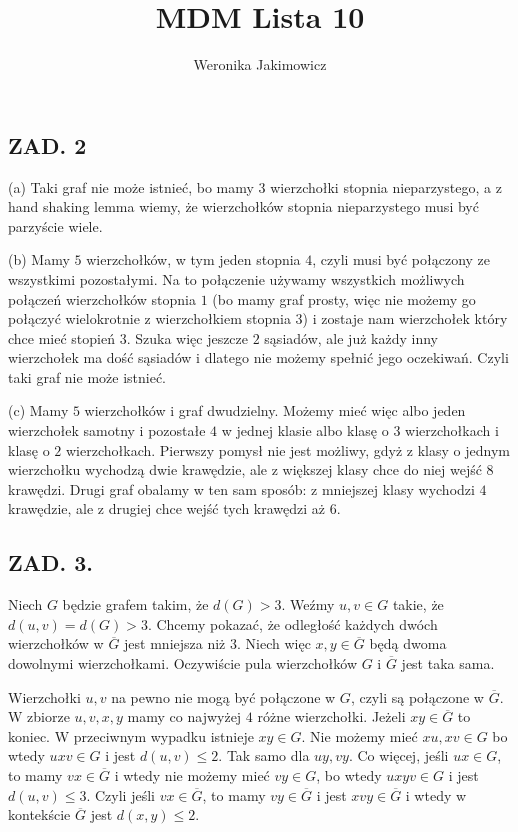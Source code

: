 \documentclass{article}
\author{Weronika Jakimowicz}
\title{MDM Lista 10}
\date{}
\begin{document}
\maketitle

\subsection*{ZAD. 2}

{\color{acc}(a)} Taki graf nie może istnieć, bo mamy 3 wierzchołki stopnia nieparzystego, a z hand shaking lemma wiemy, że wierzchołków stopnia nieparzystego musi być parzyście wiele.
\medskip

{\color{acc}(b)} Mamy $5$ wierzchołków, w tym jeden stopnia $4$, czyli musi być połączony ze wszystkimi pozostałymi. Na to połączenie używamy wszystkich możliwych połączeń wierzchołków stopnia $1$ (bo mamy graf prosty, więc nie możemy go połączyć wielokrotnie z wierzchołkiem stopnia $3$) i zostaje nam wierzchołek który chce mieć stopień $3$. Szuka więc jeszcze $2$ sąsiadów, ale już każdy inny wierzchołek ma dość sąsiadów i dlatego nie możemy spełnić jego oczekiwań. Czyli taki graf nie może istnieć.
\medskip

{\color{acc}(c)} Mamy $5$ wierzchołków i graf dwudzielny. Możemy mieć więc albo jeden wierzchołek samotny i pozostałe $4$ w jednej klasie albo klasę o $3$ wierzchołkach i klasę o $2$ wierzchołkach. Pierwszy pomysł nie jest możliwy, gdyż z klasy o jednym wierzchołku wychodzą dwie krawędzie, ale z większej klasy chce do niej wejść $8$ krawędzi. Drugi graf obalamy w ten sam sposób: z mniejszej klasy wychodzi $4$ krawędzie, ale z drugiej chce wejść tych krawędzi aż $6$.

\subsection*{ZAD. 3.}

Niech $G$ będzie grafem takim, że $d(G)>3$. Weźmy $u,v\in G$ takie, że $d(u, v)=d(G)>3$. Chcemy pokazać, że odległość każdych dwóch wierzchołków w $\overline G$ jest mniejsza niż $3$. Niech więc $x,y\in \overline G$ będą dwoma dowolnymi wierzchołkami. Oczywiście pula wierzchołków $G$ i $\overline G$ jest taka sama.

Wierzchołki $u,v$ na pewno nie mogą być połączone w $G$, czyli są połączone w $\overline G$. W zbiorze $u,v,x,y$ mamy co najwyżej $4$ różne wierzchołki. Jeżeli $xy\in \overline G$ to koniec. W przeciwnym wypadku istnieje $xy\in G$. Nie możemy mieć $xu,xv\in G$ bo wtedy $uxv\in G$ i jest $d(u,v)\leq2$. Tak samo dla $uy,vy$. Co więcej, jeśli $ux\in G$, to mamy $vx\in\overline G$ i wtedy nie możemy mieć $vy\in G$, bo wtedy $uxyv\in G$ i jest $d(u,v)\leq 3$. Czyli jeśli $vx\in\overline G$, to mamy $vy\in\overline G$ i jest $xvy\in\overline G$ i wtedy w kontekście $\overline G$ jest $d(x,y)\leq 2$.
\end{document}
